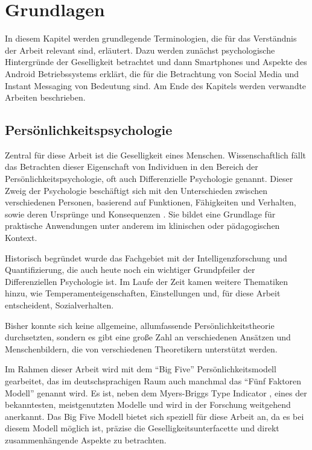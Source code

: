 
\chapter{Grundlagen}
\label{ch:Grundlagen}

In diesem Kapitel werden grundlegende Terminologien, die für das Verständnis der Arbeit relevant sind, erläutert.
Dazu werden zunächst psychologische Hintergründe der Geselligkeit betrachtet und
dann Smartphones und Aspekte des Android Betriebssystems erklärt, die für die Betrachtung von Social Media und Instant Messaging von Bedeutung sind.
Am Ende des Kapitels werden verwandte Arbeiten beschrieben.

\section{Persönlichkeitspsychologie}
\label{ch:Grundlagen:sec:Abschnitt1}

Zentral für diese Arbeit ist die Geselligkeit eines Menschen.
Wissenschaftlich fällt das Betrachten dieser Eigenschaft von Individuen in den Bereich der Persönlichkeitspsychologie,
oft auch Differenzielle Psychologie genannt. 
Dieser Zweig der Psychologie beschäftigt sich mit den Unterschieden zwischen verschiedenen Personen, 
basierend auf Funktionen, Fähigkeiten und Verhalten, sowie deren Ursprünge und Konsequenzen \cite{amelang2006differentielle}.
Sie bildet eine Grundlage für praktische Anwendungen unter anderem im klinischen oder pädagogischen Kontext.
\par

Historisch begründet wurde das Fachgebiet mit der Intelligenzforschung und Quantifizierung, 
die auch heute noch ein wichtiger Grundpfeiler der Differenziellen Psychologie ist.
Im Laufe der Zeit kamen weitere Thematiken hinzu, wie Temperamenteigenschaften, Einstellungen und, für diese Arbeit entscheident, Sozialverhalten.
\par

Bisher konnte sich keine allgemeine, allumfassende Persönlichkeitstheorie durchsetzten, sondern es gibt eine große Zahl an verschiedenen Ansätzen und Menschenbildern, die von verschiedenen Theoretikern unterstützt werden.
Im Rahmen dieser Arbeit wird mit dem "`Big Five"' Persönlichkeitsmodell gearbeitet, das im deutschsprachigen Raum auch manchmal das "`Fünf Faktoren Modell"' genannt wird.
Es ist, neben dem Myers-Briggs Type Indicator \cite{briggs1980gifts}, eines der bekanntesten, meistgenutzten Modelle und wird in der Forschung weitgehend anerkannt.
Das Big Five Modell bietet sich speziell für diese Arbeit an, da es bei diesem Modell möglich ist, präzise die Geselligkeitsunterfacette und direkt zusammenhängende Aspekte zu betrachten.

